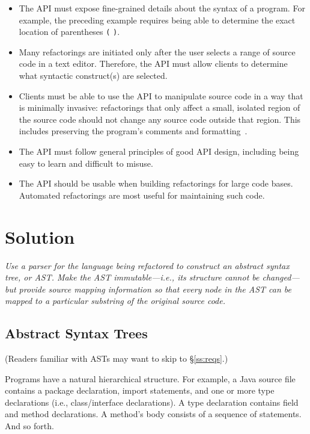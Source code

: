 \documentclass[prodmode]{acmlarge}
\newcommand{\ttt}[1]{\texttt{#1}}
\begin{document}
\begin{itemize}

\item The API must expose fine-grained details about the syntax of a program.
For example, the preceding example requires being able to determine the
exact location of parentheses \ttt{(} \ttt{)}.

\item Many refactorings are initiated only after the user selects a range of
source code in a text editor.  Therefore, the API must allow clients to
determine what syntactic construct(s) are selected.

\item Clients must be able to use the API to manipulate source code in a way
that is minimally invasive: refactorings that only affect a small, isolated
region of the source code should not change any source code outside that
region.  This includes preserving the program's comments and
formatting~\cite{sommerlad08retaining}.

\item The API must follow general principles of good API design, including
being easy to learn and difficult to misuse.

\item The API should be usable when building refactorings for large code bases.
Automated refactorings are most useful for maintaining such code.

\end{itemize}

\section{Solution}

\textit{Use a parser for the language being refactored to construct an
\textup{abstract syntax tree}, or \textup{AST}.  Make the AST
\textup{immutable}---i.e., its structure cannot be changed---but provide
\textup{source mapping} information so that every node in the AST can be mapped
to a particular substring of the original source code.}

\subsection{Abstract Syntax Trees}
\label{ss:asts}

(Readers familiar with ASTs may want to skip to \S\ref{ss:reqs}.)

Programs have a natural hierarchical structure.  For example, a Java source
file contains a package declaration, import statements, and one or more type
declarations (i.e., class/interface declarations).  A type declaration contains
field and method declarations.  A method's body consists of a sequence of
statements.  And so forth.
\end{document}
